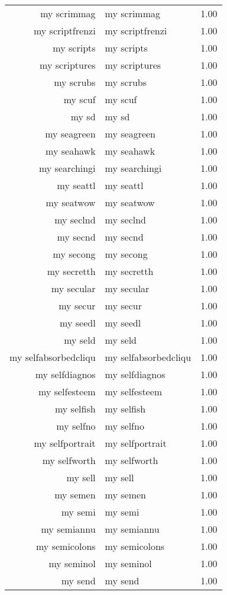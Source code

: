 \begin{table}[ht]
\begin{tabular}{rlr}
  my scrimmag & my scrimmag & 1.00 \\ 
  my scriptfrenzi & my scriptfrenzi & 1.00 \\ 
  my scripts & my scripts & 1.00 \\ 
  my scriptures & my scriptures & 1.00 \\ 
  my scrubs & my scrubs & 1.00 \\ 
  my scuf & my scuf & 1.00 \\ 
  my sd & my sd & 1.00 \\ 
  my seagreen & my seagreen & 1.00 \\ 
  my seahawk & my seahawk & 1.00 \\ 
  my searchingi & my searchingi & 1.00 \\ 
  my seattl & my seattl & 1.00 \\ 
  my seatwow & my seatwow & 1.00 \\ 
  my seclnd & my seclnd & 1.00 \\ 
  my secnd & my secnd & 1.00 \\ 
  my secong & my secong & 1.00 \\ 
  my secretth & my secretth & 1.00 \\ 
  my secular & my secular & 1.00 \\ 
  my secur & my secur & 1.00 \\ 
  my seedl & my seedl & 1.00 \\ 
  my seld & my seld & 1.00 \\ 
  my selfabsorbedcliqu & my selfabsorbedcliqu & 1.00 \\ 
  my selfdiagnos & my selfdiagnos & 1.00 \\ 
  my selfesteem & my selfesteem & 1.00 \\ 
  my selfish & my selfish & 1.00 \\ 
  my selfno & my selfno & 1.00 \\ 
  my selfportrait & my selfportrait & 1.00 \\ 
  my selfworth & my selfworth & 1.00 \\ 
  my sell & my sell & 1.00 \\ 
  my semen & my semen & 1.00 \\ 
  my semi & my semi & 1.00 \\ 
  my semiannu & my semiannu & 1.00 \\ 
  my semicolons & my semicolons & 1.00 \\ 
  my seminol & my seminol & 1.00 \\ 
  my send & my send & 1.00 \\ 

\end{tabular}
\end{table}
